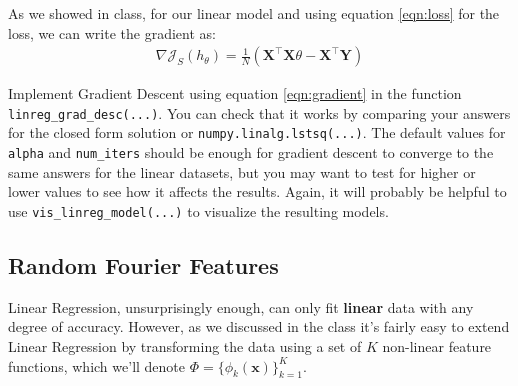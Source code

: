\documentclass{article} %
\begin{document}
\begin{algorithm}[H]
	\SetAlgoLined
\end{algorithm}

As we showed in class, for our linear model and using equation \ref{eqn:loss} for the loss, we can write the gradient as:
\begin{align}
	\nabla \mathcal{J}_S(h_\theta) = \frac{1}{N}\left(\mathbf{X}^\top\mathbf{X}\theta -\mathbf{X}^\top\mathbf{Y}\right) \label{eqn:gradient}
\end{align}

Implement Gradient Descent using equation \ref{eqn:gradient} in the function \texttt{linreg\_grad\_desc(...)}. You can check 
that it works by comparing your answers for the closed form solution or \texttt{numpy.linalg.lstsq(...)}. The default values 
for \texttt{alpha} and \texttt{num\_iters} should be enough for gradient descent to converge to the same answers for the 
linear datasets, but you may want to test for higher or lower values to see how it affects the results. Again, it will 
probably be helpful to use \texttt{vis\_linreg\_model(...)} to visualize the resulting models.

\subsection*{Random Fourier Features}

Linear Regression, unsurprisingly enough, can only fit \textbf{linear} data with any degree of accuracy. However, as we 
discussed in the class it's fairly easy to extend Linear Regression by transforming the data using a set of \(K\) non-linear 
feature functions, which we'll denote \(\Phi=\{\phi_k(\mathbf{x})\}_{k=1}^K\).
\end{document}
